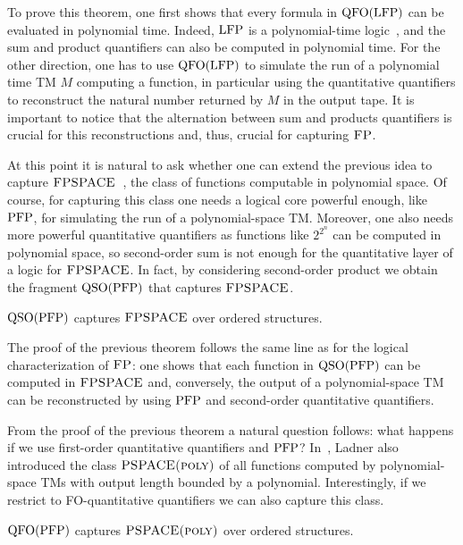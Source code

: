 To prove this theorem, 
one first shows that every formula in ${\rm QFO}({\rm LFP})$ can be evaluated in polynomial time. 
Indeed, ${\rm LFP}$ is a polynomial-time logic~\cite{I86,vardi1982complexity}, and the sum and product quantifiers can also be computed in polynomial time. 
For the other direction, one has to use ${\rm QFO}({\rm LFP})$ to simulate the run of a polynomial time TM $M$ computing a function, in particular using the quantitative quantifiers to reconstruct the natural number returned by $M$ in the output tape. 
It is important to notice that the alternation between sum and products quantifiers is crucial for this reconstructions and, thus, crucial for capturing $\text{\sc FP}$.

At this point it is natural to ask whether one can extend the previous idea to capture $\text{\sc FPSPACE}$~\cite{Ladner89}, the class of functions computable in polynomial space. 
Of course, for capturing this class one needs a logical core powerful enough, like ${\rm PFP}$, for simulating the run of a polynomial-space TM.
Moreover, 
one also needs more powerful quantitative quantifiers as functions like $2^{2^n}$ can be computed in polynomial space,
so second-order sum is not enough for the quantitative layer of a logic for $\text{\sc FPSPACE}$.
In fact, by considering second-order product we obtain the fragment ${\rm QSO}({\rm PFP})$ that 
captures $\text{\sc FPSPACE}$. 
\begin{theorem} \label{theo:capture-fpspace}
	${\rm QSO}({\rm PFP})$ captures $\text{\sc FPSPACE}$ over ordered structures.
\end{theorem}
The proof of the previous theorem follows the same line as for the logical characterization of $\text{\sc FP}$: one shows that each function in ${\rm QSO}({\rm PFP})$ can be computed in $\text{\sc FPSPACE}$ and, conversely, the output of a polynomial-space TM can be reconstructed by using ${\rm PFP}$ and second-order quantitative quantifiers.

From the proof of the previous theorem a natural question follows: what happens if we use first-order quantitative quantifiers and ${\rm PFP}$?
In~\cite{Ladner89}, Ladner also introduced the class $\text{\sc PSPACE(poly)}$ of all functions computed by polynomial-space TMs 
with output length bounded by a polynomial.
Interestingly, if we restrict to FO-quantitative quantifiers we can also capture this class.
\begin{corollary} \label{cor:capture-fpspace-poly}
	${\rm QFO}({\rm PFP})$ captures $\text{\sc PSPACE(poly)}$ over ordered structures.
\end{corollary}

